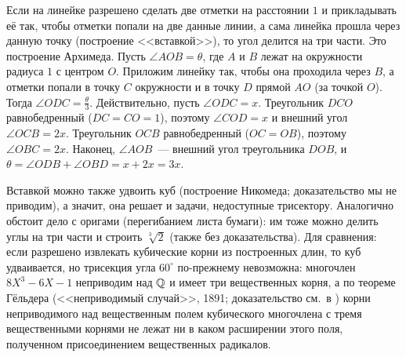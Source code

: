 \begin{aside}
Если на линейке разрешено сделать две отметки на расстоянии $1$ и прикладывать её так, чтобы отметки попали на две
данные линии, а сама линейка прошла через данную точку (построение <<вставкой>>), то угол делится на три части. Это
построение Архимеда. Пусть $\angle AOB=\theta$, где $A$ и $B$ лежат на окружности радиуса $1$ с центром $O$. Приложим
линейку так, чтобы она проходила через $B$, а отметки попали в точку $C$ окружности и в точку $D$ прямой $AO$ (за
точкой $O$). Тогда $\angle ODC=\frac\theta3$. Действительно, пусть $\angle ODC=x$. Треугольник $DCO$ равнобедренный
($DC=CO=1$), поэтому $\angle COD=x$ и внешний угол $\angle OCB=2x$. Треугольник $OCB$ равнобедренный ($OC=OB$), поэтому
$\angle OBC=2x$. Наконец, $\angle AOB$~--- внешний угол треугольника $DOB$, и $\theta=\angle ODB+\angle OBD=x+2x=3x$.

Вставкой можно также удвоить куб (построение Никомеда; доказательство мы не приводим), а значит, она решает и задачи,
недоступные трисектору. Аналогично обстоит дело с оригами (перегибанием листа бумаги): им тоже можно делить углы на
три части и строить $\sqrt[3]2$ (также без доказательства). Для сравнения: если разрешено извлекать кубические корни
из построенных длин, то куб удваивается, но трисекция угла $60^\circ$ по-прежнему невозможна: многочлен $8X^3-6X-1$
неприводим над $\mathbb Q$ и имеет три вещественных корня, а по теореме Гёльдера (<<неприводимый случай>>, 1891;
доказательство см.\ в ) корни неприводимого над вещественным полем
кубического многочлена с тремя вещественными корнями не лежат ни в каком расширении этого поля, полученном
присоединением вещественных радикалов.
\end{aside}

\begin{center}
\begin{keepfig}
\centering
{}
\end{keepfig}
\end{center}
